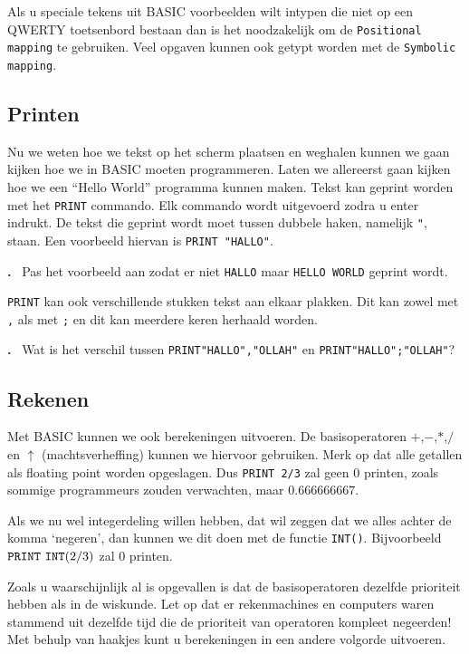 \documentclass{article}
\newcounter{problem}
\newcounter{solution}
\newcommand\problem{%
  \stepcounter{problem}%
  \textbf{\theproblem.}~%
  \setcounter{solution}{0}%
}
\begin{document}
Als u speciale tekens uit BASIC voorbeelden wilt intypen die niet op een QWERTY toetsenbord bestaan dan is het noodzakelijk om de \verb:Positional mapping: te gebruiken.
Veel opgaven kunnen ook getypt worden met de \verb:Symbolic mapping:.

\subsection{Printen}

Nu we weten hoe we tekst op het scherm plaatsen en weghalen kunnen we gaan kijken hoe we in BASIC moeten programmeren.
Laten we allereerst gaan kijken hoe we een ``Hello World'' programma kunnen maken.
Tekst kan geprint worden met het \verb:PRINT: commando.
Elk commando wordt uitgevoerd zodra u enter indrukt.
De tekst die geprint wordt moet tussen dubbele haken, namelijk \verb:":, staan.
Een voorbeeld hiervan is \verb:PRINT "HALLO":.

\problem Pas het voorbeeld aan zodat er niet \verb:HALLO: maar \verb:HELLO WORLD: geprint wordt.

\verb:PRINT: kan ook verschillende stukken tekst aan elkaar plakken.
Dit kan zowel met \verb:,: als met \verb:;: en dit kan meerdere keren herhaald worden.

\problem Wat is het verschil tussen \verb:PRINT"HALLO","OLLAH": en \verb:PRINT"HALLO";"OLLAH":?

\subsection{Rekenen}

Met BASIC kunnen we ook berekeningen uitvoeren.
De basisoperatoren $+$,$-$,$*$,$/$ en $\uparrow$ (machtsverheffing) kunnen we hiervoor gebruiken.
Merk op dat alle getallen als floating point worden opgeslagen.
Dus \verb:PRINT 2/3: zal geen $0$ printen, zoals sommige programmeurs zouden verwachten, maar $0.666666667$.

Als we nu wel integerdeling willen hebben, dat wil zeggen dat we alles achter de komma `negeren',
dan kunnen we dit doen met de functie \verb:INT():.
Bijvoorbeeld $\verb:PRINT:\ \verb:INT:(2/3)$ zal $0$ printen.

Zoals u waarschijnlijk al is opgevallen is dat de basisoperatoren dezelfde prioriteit hebben als in de wiskunde.
Let op dat er rekenmachines en computers waren stammend uit dezelfde tijd die de prioriteit van operatoren kompleet negeerden!
Met behulp van haakjes kunt u berekeningen in een andere volgorde uitvoeren.
\end{document}
